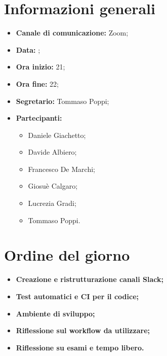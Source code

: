 \section{Informazioni generali}

\begin{itemize}

	\item \textbf{Canale di comunicazione:} Zoom;
	
	\item \textbf{Data:} \DataMeeting{};
	
	\item \textbf{Ora inizio:} 21;
	
	\item \textbf{Ora fine:} 22;
	
	\item \textbf{Segretario:} Tommaso Poppi;
	
	\item \textbf{Partecipanti:}
	
		\begin{itemize}

			\item Daniele Giachetto;
			\item Davide Albiero;
			\item Francesco De Marchi;
			\item Giosuè Calgaro;
			\item Lucrezia Gradi;
			\item Tommaso Poppi.

		\end{itemize}

\end{itemize}



\section{Ordine del giorno}

\begin{itemize}

	\item\textbf{Creazione e ristrutturazione canali Slack;}
	
	\item\textbf{Test automatici e CI per il codice;}

	\item\textbf{Ambiente di sviluppo;}

	\item\textbf{Riflessione sul workflow da utilizzare;}
	
	\item\textbf{Riflessione su esami e tempo libero.}

\end{itemize}

